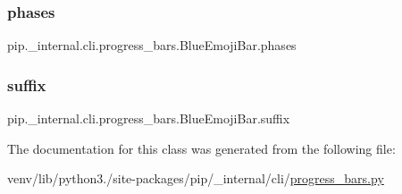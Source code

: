 \subsubsection{\texorpdfstring{phases}{phases}}
{\footnotesize\ttfamily pip.\+\_\+internal.\+cli.\+progress\+\_\+bars.\+Blue\+Emoji\+Bar.\+phases\hspace{0.3cm}{\ttfamily [static]}}

\mbox{\label{classpip_1_1__internal_1_1cli_1_1progress__bars_1_1BlueEmojiBar_a16ca464d2e1de41c512490bafd1d9e25}} 
\subsubsection{\texorpdfstring{suffix}{suffix}}
{\footnotesize\ttfamily pip.\+\_\+internal.\+cli.\+progress\+\_\+bars.\+Blue\+Emoji\+Bar.\+suffix\hspace{0.3cm}{\ttfamily [static]}}



The documentation for this class was generated from the following file\+:\begin{DoxyCompactItemize}
\item 
venv/lib/python3./site-\/packages/pip/\+\_\+internal/cli/\hyperlink{progress__bars_8py}{progress\+\_\+bars.\+py}\end{DoxyCompactItemize}
